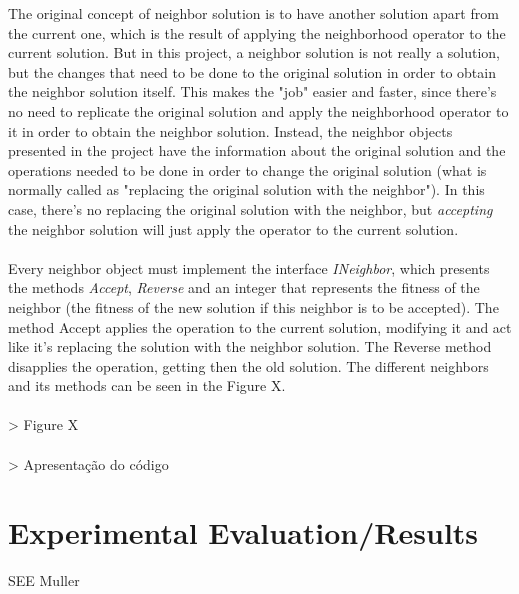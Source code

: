 The original concept of neighbor solution is to have another solution apart from the current one, which is the result of applying the neighborhood operator to the current solution. But in this project, a neighbor solution is not really a solution, but the changes that need to be done to the original solution in order to obtain the neighbor solution itself. This makes the "job" easier and faster, since there's no need to replicate the original solution and apply the neighborhood operator to it in order to obtain the neighbor solution. Instead, the neighbor objects presented in the project have the information about the original solution and the operations needed to be done in order to change the original solution (what is normally called as "replacing the original solution with the neighbor"). In this case, there's no replacing the original solution with the neighbor, but \textit{accepting} the neighbor solution will just apply the operator to the current solution.\\
\\
Every neighbor object must implement the interface \textit{INeighbor}, which presents the methods \textit{Accept}, \textit{Reverse} and an integer that represents the fitness of the neighbor (the fitness of the new solution if this neighbor is to be accepted). The method Accept applies the operation to the current solution, modifying it and act like it's replacing the solution with the neighbor solution. The Reverse method disapplies the operation, getting then the old solution. The different neighbors and its methods can be seen in the Figure X.\\
\\
> Figure X\\
\\
> Apresentação do código

\section{Experimental Evaluation/Results}
\label{sec:SaResults}

SEE Muller

